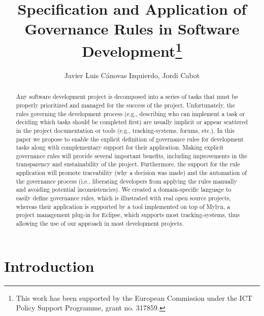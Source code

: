 \documentclass{llncs}
\begin{document}
\title{Specification and Application of Governance Rules in Software Development\thanks{This work has been supported by the European Commission under the ICT Policy Support Programme, grant no. 317859.}}
\author{Javier Luis C\'anovas Izquierdo, Jordi Cabot}


\maketitle


\begin{abstract}
Any software development project is decomposed into a series of tasks that must be properly prioritized and managed for the success of the project. Unfortunately, the rules governing the development process (e.g., describing who can implement a task or deciding which tasks should be completed first) are usually implicit or appear scattered in the project documentation or tools (e.g., tracking-systems, forums, etc.). In this paper we propose to enable the explicit definition of governance rules for development tasks along with complementary support for their application. Making explicit governance rules will provide several important benefits, including improvements in the transparency and sustainability of the project. Furthermore, the support for the rule application will promote traceability (why a decision was made) and the automation of the governance process (i.e., liberating developers from applying the rules manually and avoiding potential inconsistencies). We created a domain-specific language to easily define governance rules, which is illustrated with real open source projects, whereas their application is supported by a tool implemented on top of Mylyn, a project management plug-in for Eclipse, which supports most tracking-systems, thus allowing the use of our approach in most development projects.
\end{abstract}


\section{Introduction}
\label{sec:introduction}

\end{document}
